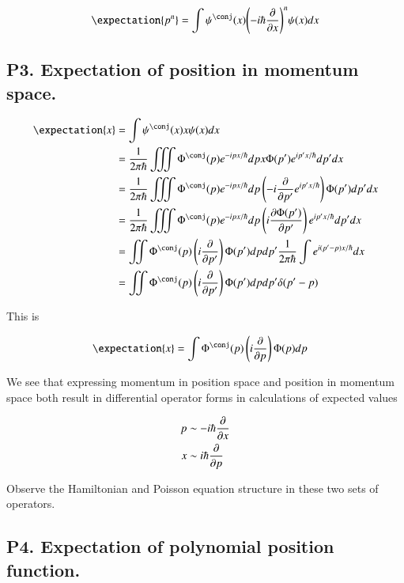 \begin{align*}
\expectation{p^n} 
&= \int \psi^\conj(x) {\left( -i \hbar \PD{x}{} \right)}^n {\psi(x)} dx \\
\end{align*}

\subsection{P3.  Expectation of position in momentum space. }

\begin{align*}
\expectation{x} 
&= \int \psi^\conj(x) x \psi(x) dx \\
&= 
\inv{2\pi\hbar} \iiint \Phi^\conj(p) e^{-ipx/\hbar} dp x \Phi(p') e^{ip'x/\hbar} dp' dx \\
&= 
\inv{2\pi\hbar} \iiint \Phi^\conj(p) e^{-ipx/\hbar} dp \left( -i \PD{p'}{} e^{ip'x/\hbar} \right) \Phi(p') dp' dx \\
&= 
\inv{2\pi\hbar} \iiint \Phi^\conj(p) e^{-ipx/\hbar} dp \left( i \PD{p'}{\Phi(p')} \right) e^{ip'x/\hbar} dp' dx \\
&= 
\iint \Phi^\conj(p) \left( i \PD{p'}{} \right) {\Phi(p')} dp dp' \inv{2\pi\hbar} \int e^{i(p'-p)x/\hbar} dx  \\
&= 
\iint \Phi^\conj(p) \left( i \PD{p'}{} \right) {\Phi(p')} dp dp' \delta(p'-p)  \\
\end{align*}

This is

\begin{align*}
\expectation{x} &= \int \Phi^\conj(p) \left( i \PD{p}{} \right) {\Phi(p)} dp 
\end{align*}

We see that expressing momentum in position space and position in momentum space both result in differential
operator forms in calculations of expected values

\begin{align}\label{eqn:bohm_ch9:operatorCorrespondance}
p &\sim -i \hbar \frac{\partial {}}{\partial {x}} \\
x &\sim i \hbar \frac{\partial {}}{\partial {p}}
\end{align}

Observe the Hamiltonian and Poisson equation structure in these two sets of operators.

\subsection{P4. Expectation of polynomial position function. }

